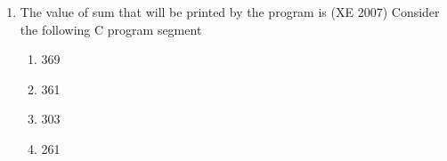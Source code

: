 \documentclass[journal,12pt,onecolumn]{IEEEtran}
\theoremstyle{remark}
\begin{document}
\begin{enumerate}
\item The value of sum that will be printed by the program is
\hfill{(XE 2007)}
Consider the following C program segment\\ 


\begin{multicols}{4}
\begin{enumerate}
\item 369
\item 361
\item 303
\item 261
\end{enumerate} 
\end{multicols}

\end{enumerate}
\end{document}
